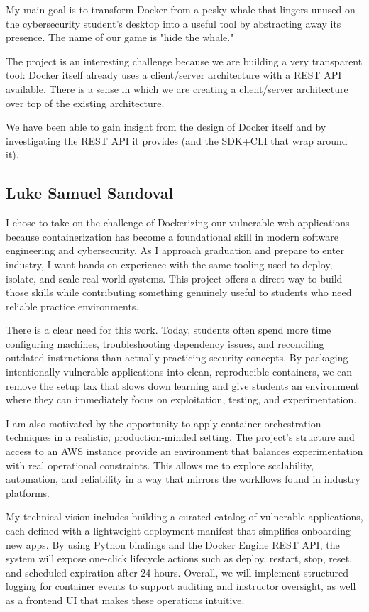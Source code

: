 \documentclass[12pt,titlepage]{article}
\begin{document}
My main goal is to transform Docker from a pesky whale that lingers unused on the cybersecurity student's desktop into a useful tool by abstracting away its presence. The name of our game is "hide the whale."

The project is an interesting challenge because we are building a very transparent tool: Docker itself already uses a client/server architecture with a REST API available. There is a sense in which we are creating a client/server architecture over top of the existing architecture.

We have been able to gain insight from the design of Docker itself and by investigating the REST API it provides (and the SDK+CLI that wrap around it).

\subsection{Luke Samuel Sandoval}
I chose to take on the challenge of Dockerizing our vulnerable web applications because containerization has become a foundational skill in modern software engineering and cybersecurity. As I approach graduation and prepare to enter industry, I want hands-on experience with the same tooling used to deploy, isolate, and scale real-world systems. This project offers a direct way to build those skills while contributing something genuinely useful to students who need reliable practice environments.

There is a clear need for this work. Today, students often spend more time configuring machines, troubleshooting dependency issues, and reconciling outdated instructions than actually practicing security concepts. By packaging intentionally vulnerable applications into clean, reproducible containers, we can remove the setup tax that slows down learning and give students an environment where they can immediately focus on exploitation, testing, and experimentation.

I am also motivated by the opportunity to apply container orchestration techniques in a realistic, production-minded setting. The project’s structure and access to an AWS instance provide an environment that balances experimentation with real operational constraints. This allows me to explore scalability, automation, and reliability in a way that mirrors the workflows found in industry platforms.

My technical vision includes building a curated catalog of vulnerable applications, each defined with a lightweight deployment manifest that simplifies onboarding new apps. By using Python bindings and the Docker Engine REST API, the system will expose one-click lifecycle actions such as deploy, restart, stop, reset, and scheduled expiration after 24 hours. Overall, we will implement structured logging for container events to support auditing and instructor oversight, as well as a frontend UI that makes these operations intuitive.
\end{document}
